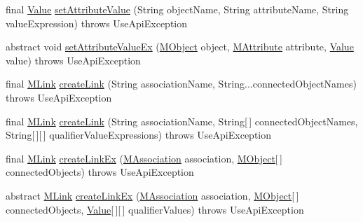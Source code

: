 \begin{DoxyCompactItemize}
\item 
final \hyperlink{classorg_1_1tzi_1_1use_1_1uml_1_1ocl_1_1value_1_1_value}{Value} \hyperlink{classorg_1_1tzi_1_1use_1_1api_1_1_use_system_api_a79720cad709b85a8005eb5bfbdc00050}{set\-Attribute\-Value} (String object\-Name, String attribute\-Name, String value\-Expression)  throws Use\-Api\-Exception 
\item 
abstract void \hyperlink{classorg_1_1tzi_1_1use_1_1api_1_1_use_system_api_a0f7f22a0f45fd4f24ec0be19e50bcb2b}{set\-Attribute\-Value\-Ex} (\hyperlink{interfaceorg_1_1tzi_1_1use_1_1uml_1_1sys_1_1_m_object}{M\-Object} object, \hyperlink{classorg_1_1tzi_1_1use_1_1uml_1_1mm_1_1_m_attribute}{M\-Attribute} attribute, \hyperlink{classorg_1_1tzi_1_1use_1_1uml_1_1ocl_1_1value_1_1_value}{Value} value)  throws Use\-Api\-Exception
\item 
final \hyperlink{interfaceorg_1_1tzi_1_1use_1_1uml_1_1sys_1_1_m_link}{M\-Link} \hyperlink{classorg_1_1tzi_1_1use_1_1api_1_1_use_system_api_a09ee89bf99c4e35505cdb07d1b537bda}{create\-Link} (String association\-Name, String...\-connected\-Object\-Names)  throws Use\-Api\-Exception 
\item 
final \hyperlink{interfaceorg_1_1tzi_1_1use_1_1uml_1_1sys_1_1_m_link}{M\-Link} \hyperlink{classorg_1_1tzi_1_1use_1_1api_1_1_use_system_api_afb14b7d8cbeaaa71cee9a504ce1091d0}{create\-Link} (String association\-Name, String\mbox{[}$\,$\mbox{]} connected\-Object\-Names, String\mbox{[}$\,$\mbox{]}\mbox{[}$\,$\mbox{]} qualifier\-Value\-Expressions)  throws Use\-Api\-Exception 
\item 
final \hyperlink{interfaceorg_1_1tzi_1_1use_1_1uml_1_1sys_1_1_m_link}{M\-Link} \hyperlink{classorg_1_1tzi_1_1use_1_1api_1_1_use_system_api_ae57e135d16cd9b47a6c27369ff92ec0d}{create\-Link\-Ex} (\hyperlink{interfaceorg_1_1tzi_1_1use_1_1uml_1_1mm_1_1_m_association}{M\-Association} association, \hyperlink{interfaceorg_1_1tzi_1_1use_1_1uml_1_1sys_1_1_m_object}{M\-Object}\mbox{[}$\,$\mbox{]} connected\-Objects)  throws Use\-Api\-Exception 
\item 
abstract \hyperlink{interfaceorg_1_1tzi_1_1use_1_1uml_1_1sys_1_1_m_link}{M\-Link} \hyperlink{classorg_1_1tzi_1_1use_1_1api_1_1_use_system_api_a199e6206aca19d70f27c42e5d3590810}{create\-Link\-Ex} (\hyperlink{interfaceorg_1_1tzi_1_1use_1_1uml_1_1mm_1_1_m_association}{M\-Association} association, \hyperlink{interfaceorg_1_1tzi_1_1use_1_1uml_1_1sys_1_1_m_object}{M\-Object}\mbox{[}$\,$\mbox{]} connected\-Objects, \hyperlink{classorg_1_1tzi_1_1use_1_1uml_1_1ocl_1_1value_1_1_value}{Value}\mbox{[}$\,$\mbox{]}\mbox{[}$\,$\mbox{]} qualifier\-Values)  throws Use\-Api\-Exception

\end{DoxyCompactItemize}
